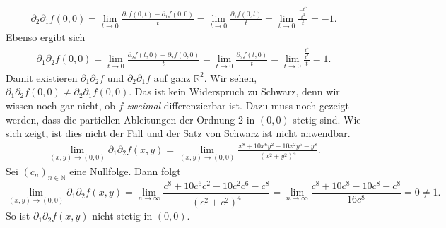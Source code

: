 \documentclass[a4paper, landscape,twocolumn,fontsize=8pt]{scrartcl}
\theoremstyle{plain}
\begin{document}
\begin{enumerate}[label=(\roman*)]
    \begin{align*}
        \partial_2\partial_1 f(0,0) = \lim_{t \to 0} \frac{\partial_1f(0,t)-\partial_1f(0,0)}{t} = \lim_{t \to 0} \frac{\partial_1f(0,t)}{t} = \lim_{t \to 0} \frac{\frac{-t^5}{t^4}}{t} = -1.
    \end{align*}
    Ebenso ergibt sich
    \begin{align*}
        \partial_1\partial_2 f(0,0) = \lim_{t \to 0} \frac{\partial_2f(t,0)-\partial_2f(0,0)}{t} = \lim_{t \to 0} \frac{\partial_2f(t,0)}{t} = \lim_{t \to 0} \frac{\frac{t^5}{t^4}}{t} = 1.
    \end{align*}
    Damit existieren $\partial_1\partial_2 f$ und $\partial_2\partial_1 f$ auf ganz $\mathbb R^2$. Wir sehen, $\partial_1\partial_2 f(0,0) \neq \partial_2\partial_1 f(0,0)$. Das ist kein Widerspruch zu Schwarz, denn wir wissen noch gar nicht, ob $f$ \emph{zweimal} differenzierbar ist. Dazu muss noch gezeigt werden, dass die partiellen Ableitungen der Ordnung $2$ in $(0,0)$ stetig sind. Wie sich zeigt, ist dies nicht der Fall und der Satz von Schwarz ist nicht anwendbar.
    \begin{align*}
        \lim_{(x,y) \to (0,0)} \partial_1\partial_2 f(x,y) = \lim_{(x,y) \to (0,0)} \frac{x^8 + 10 x^6 y^2 - 10 x^2 y^6 - y^8}{(x^2+y^2)^4}.
    \end{align*}
    Sei $(c_n)_{n \in \mathbb N}$ eine Nullfolge. Dann folgt 
    \[
        \lim_{(x,y) \to (0,0)} \partial_1\partial_2 f(x,y) = \lim_{n \to \infty} \frac{c^8 + 10 c^6 c^2 - 10 c^2 c^6 - c^8}{(c^2+c^2)^4} =\lim_{n \to \infty} \frac{c^8 + 10 c^8 - 10 c^8 - c^8}{16c^8} = 0 \neq 1.
    \]
    So ist $\partial_1\partial_2 f(x,y)$ nicht stetig in $(0,0)$.
\end{enumerate}
\end{document}
